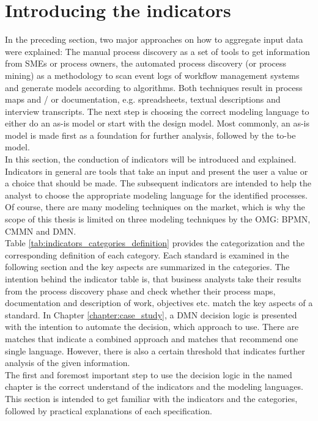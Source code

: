 \section{Introducing the indicators}
\label{section:indicator_introduction}
In the preceding section, two major approaches on how to aggregate input data were explained: The manual process discovery as a set of tools to get information from SMEs or process owners, the automated process discovery (or process mining) as a methodology to scan event logs of workflow management systems and generate models according to algorithms. Both techniques result in process maps and / or documentation, e.g. spreadsheets, textual descriptions and interview transcripts. The next step is choosing the correct modeling language to either do an as-is model or start with the design model. Most commonly, an as-is model is made first as a foundation for further analysis, followed by the to-be model. \\
In this section, the conduction of indicators will be introduced and explained. Indicators in general are tools that take an input and present the user a value or a choice that should be made. The subsequent indicators are intended to help the analyst to choose the appropriate modeling language for the identified processes. Of course, there are many modeling techniques on the market, which is why the scope of this thesis is limited on three modeling techniques by the \ac{OMG}: BPMN, CMMN and DMN. 
\\
Table \ref{tab:indicators_categories_definition} provides the categorization and the corresponding definition of each category. Each standard is examined in the following section and the key aspects are summarized in the categories. 
The intention behind the indicator table is, that business analysts take their results from the process discovery phase and check whether their process maps, documentation and description of work, objectives etc. match the key aspects of a standard. In Chapter \ref{chapter:case_study}, a DMN decision logic is presented with the intention to automate the decision, which approach to use. There are matches that indicate a combined approach and matches that recommend one single language. However, there is also a certain threshold that indicates further analysis of the given information. \\
The first and foremost important step to use the decision logic in the named chapter is the correct understand of the indicators and the modeling languages. This section is intended to get familiar with the indicators and the categories, followed by practical explanations of each specification. 

